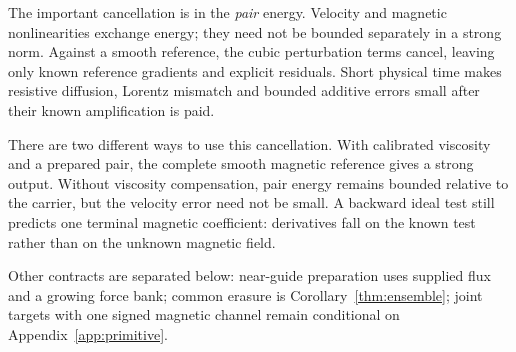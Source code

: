 \documentclass[11pt,a4paper]{amsart}
\theoremstyle{definition}
\theoremstyle{remark}
\numberwithin{equation}{section}
\begin{document}
\begin{center}
\end{center}

The important cancellation is in the \emph{pair} energy. Velocity and magnetic nonlinearities exchange energy; they need not be bounded separately in a strong norm. Against a smooth reference, the cubic perturbation terms cancel, leaving only known reference gradients and explicit residuals. Short physical time makes resistive diffusion, Lorentz mismatch and bounded additive errors small after their known amplification is paid.

There are two different ways to use this cancellation. With calibrated viscosity and a prepared pair, the complete smooth magnetic reference gives a strong output. Without viscosity compensation, pair energy remains bounded relative to the carrier, but the velocity error need not be small. A backward ideal test still predicts one terminal magnetic coefficient: derivatives fall on the known test rather than on the unknown magnetic field.

Other contracts are separated below: near-guide preparation uses supplied flux and a growing force bank; common erasure is Corollary~\ref{thm:ensemble}; joint targets with one signed magnetic channel remain conditional on Appendix~\ref{app:primitive}.
\clearpage
\end{document}
